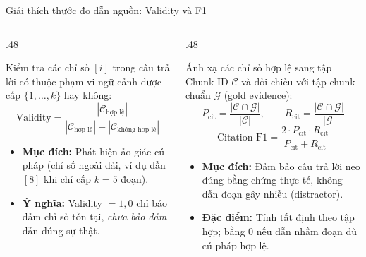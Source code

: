 \begin{frame}[t]{Giải thích thước đo dẫn nguồn: Validity và F1}
\begin{columns}[T,onlytextwidth]
\begin{column}{.48\textwidth}
{\fontsize{13.5}{17.5}\selectfont
Kiểm tra các chỉ số $[i]$ trong câu trả lời có thuộc phạm vi ngữ cảnh được cấp $\{1, \dots, k\}$ hay không:
\vspace{-2mm}
\[
\text{Validity} = \frac{|\mathcal{C}_{\text{hợp lệ}}|}{|\mathcal{C}_{\text{hợp lệ}}| + |\mathcal{C}_{\text{không hợp lệ}}|}
\]
\vspace{-2mm}
\begin{itemize}
  \setlength{\itemsep}{2pt}
  \item \textbf{Mục đích:} Phát hiện ảo giác cú pháp (chỉ số ngoài dải, ví dụ dẫn $[8]$ khi chỉ cấp $k=5$ đoạn).
  \item \textbf{Ý nghĩa:} Validity $= 1{,}0$ chỉ bảo đảm chỉ số tồn tại, \textit{chưa bảo đảm} dẫn đúng sự thật.
\end{itemize}\par}
\end{column}
\begin{column}{.48\textwidth}
{\fontsize{13.5}{17.5}\selectfont
Ánh xạ các chỉ số hợp lệ sang tập Chunk ID $\mathcal{C}$ và đối chiếu với tập chunk chuẩn $\mathcal{G}$ (gold evidence):
\vspace{-2mm}
\[
P_{\text{cit}} = \frac{|\mathcal{C} \cap \mathcal{G}|}{|\mathcal{C}|},\qquad R_{\text{cit}} = \frac{|\mathcal{C} \cap \mathcal{G}|}{|\mathcal{G}|}
\]
\vspace{-4mm}
\[
\text{Citation F1} = \frac{2 \cdot P_{\text{cit}} \cdot R_{\text{cit}}}{P_{\text{cit}} + R_{\text{cit}}}
\]
\vspace{-2mm}
\begin{itemize}
  \setlength{\itemsep}{2pt}
  \item \textbf{Mục đích:} Đảm bảo câu trả lời neo đúng bằng chứng thực tế, không dẫn đoạn gây nhiễu (distractor).
  \item \textbf{Đặc điểm:} Tính tất định theo tập hợp; bằng 0 nếu dẫn nhầm đoạn dù cú pháp hợp lệ.
\end{itemize}\par}
\end{column}
\end{columns}
\vspace{2mm}
\end{frame}
